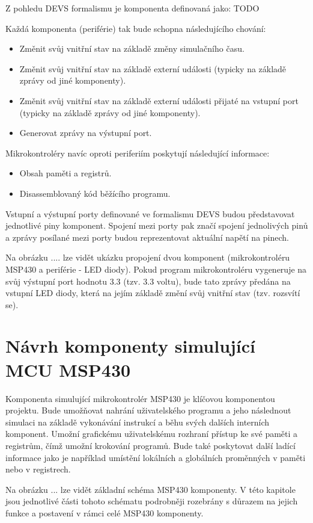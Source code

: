 Z pohledu DEVS formalismu je komponenta definovaná jako: TODO

Každá komponenta (periférie) tak bude schopna následujícího chování:

\begin{itemize}
\item Změnit svůj vnitřní stav na základě změny simulačního času.
\item Změnit svůj vnitřní stav na základě externí události (typicky na základě zprávy od jiné komponenty).
\item Změnit svůj vnitřní stav na základě externí události přijaté na vstupní port (typicky na základě zprávy od jiné komponenty).
\item Generovat zprávy na výstupní port.
\end{itemize}

Mikrokontroléry navíc oproti periferiím poskytují následující informace:

\begin{itemize}
\item Obsah paměti a registrů.
\item Disassemblovaný kód běžícího programu.
\end{itemize}

Vstupní a výstupní porty definované ve formalismu DEVS budou představovat jednotlivé piny komponent. Spojení mezi porty pak značí spojení jednolivých
pinů a zprávy posílané mezi porty budou reprezentovat aktuální napětí na pinech.

Na obrázku .... lze vidět ukázku propojení dvou komponent (mikrokontroléru MSP430 a periférie - LED diody). Pokud program mikrokontroléru vygeneruje na svůj 
výstupní port hodnotu 3.3 (tzv. 3.3 voltu), bude tato zprávy předána na vstupní LED diody, která na jejím základě změní svůj vnitřní stav (tzv. rozsvítí se).

\section{Návrh komponenty simulující MCU MSP430}

Komponenta simulující mikrokontrolér MSP430 je klíčovou komponentou projektu. Bude umožňovat nahrání uživatelského programu a jeho následnout simulaci na základě
vykonávání instrukcí a běhu svých dalších interních komponent. Umožní grafickému uživatelskému rozhraní přístup ke své paměti a registrům, čímž umožní krokování
programů. Bude také poskytovat další ladící informace jako je například umístění lokálních a globálních proměnných v paměti nebo v registrech.

Na obrázku ... lze vidět základní schéma MSP430 komponenty. V této kapitole jsou jednotlivé části tohoto schématu podrobněji rozebrány s důrazem na jejich funkce a 
postavení v rámci celé MSP430 komponenty.

